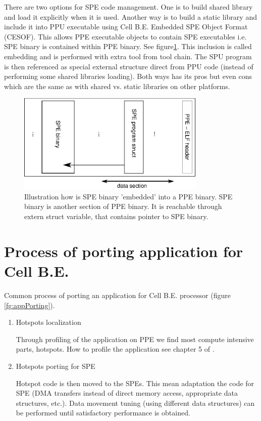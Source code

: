 \par
There are two options for SPE code management.
 One is to build shared library and load it explicitly when it is used.
Another way is to build a static library and include it into PPU executable using Cell B.E. Embedded SPE Object Format (CESOF).
This allows PPE executable objects to contain SPE executables i.e. SPE binary is contained within PPE binary. See figure\ref{fg:SPEEmbedding}.
This inclusion is called embedding and is performed with extra tool from tool chain.
The SPU program is then referenced as special external structure direct from PPU code (instead of performing some shared libraries loading).
Both ways has its pros but even cons which are the same as with shared vs. static libraries on other platforms.


\begin{figure}
    \centering
    \includegraphics[width=0.8\textwidth]{data/SPEEmbedding}
    \caption[SPE binary embedding]{Illustration how is SPE binary 'embedded' into a PPE binary.
SPE binary is another section of PPE binary.
It is reachable through extern struct variable, that contains pointer to SPE binary.}
    \label{fg:SPEEmbedding}
\end{figure}



\section {Process of porting application for Cell B.E.}
\label{sect:portingProcess}

Common process of porting an application for Cell B.E. processor (figure \ref{fg:appPorting}).
\begin{enumerate}
\item Hotspots localization
\par
Through profiling of the application on PPE we find most compute intensive parts, hotspots.
How to profile the application see chapter 5 of \cite{programmersGuide}.

\item Hotspots porting for SPE
\par
Hotspot code is then moved to the SPEs.
This mean adaptation the code for SPE (DMA transfers instead of direct memory access, appropriate data structures, etc.).
Data movement tuning (using different data structures) can be performed until satisfactory performance is obtained.
\end{enumerate}

